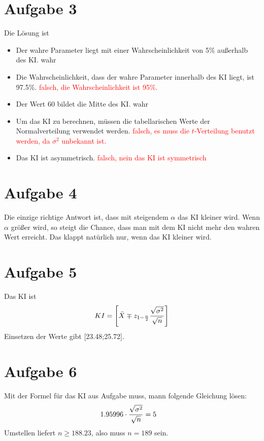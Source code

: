 \documentclass{article}
\begin{document}
	\section*{Aufgabe 3}
	Die Lösung ist
	\begin{itemize}
		\item Der wahre Parameter liegt mit einer Wahrscheinlichkeit von 5\% außerhalb des KI. \textcolor{green!80!black}{wahr}
		\item Die Wahrscheinlichkeit, dass der wahre Parameter innerhalb des KI liegt, ist 97.5\%. \textcolor{red}{falsch, die Wahrscheinlichkeit ist 95\%.}
		\item Der Wert 60 bildet die Mitte des KI. \textcolor{green!80!black}{wahr}
		\item Um das KI zu berechnen, müssen die tabellarischen Werte der Normalverteilung verwendet werden. \textcolor{red}{falsch, es muss die $t$-Verteilung benutzt werden, da $\sigma^2$ unbekannt ist.}
		\item Das KI ist asymmetrisch. \textcolor{red}{falsch, nein das KI ist symmetrisch}
	\end{itemize}

	\section*{Aufgabe 4}
	Die einzige richtige Antwort ist, dass mit steigendem $\alpha$ das KI kleiner wird. Wenn $\alpha$ größer wird, so steigt die Chance, dass man mit dem KI nicht mehr den wahren Wert erreicht. Das klappt natürlich nur, wenn das KI kleiner wird.

	\section*{Aufgabe 5}
	Das KI ist
	\begin{align}
		KI = \left[\bar{X} \mp z_{1-\frac{\alpha}{2}}\frac{\sqrt{\sigma^2}}{\sqrt{n}}\right] \notag
	\end{align}
	Einsetzen der Werte gibt [23.48;25.72].
	
	\section*{Aufgabe 6}
	Mit der Formel für das KI aus Aufgabe muss, mann folgende Gleichung lösen:
	\begin{align}
		1.95996\cdot \frac{\sqrt{\sigma^2}}{\sqrt{n}} &= 5 \notag
	\end{align}
	Umstellen liefert $n\ge 188.23$, also muss $n=189$ sein.
	
\end{document}
